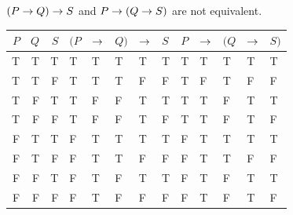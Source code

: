 \begin{small}
\begin{earg}
\noindent\begin{minipage}{0.99\textwidth}
\item $(P \rightarrow Q) \rightarrow S$ and $P \rightarrow (Q \rightarrow S)$ are not equivalent.
\begin{flushleft}
\begin{tabular}{d d d | f e e e h | f e e e e}
$P$ & $Q$ & $S$ & $(P$ & $\rightarrow$ & $Q)$ & $\rightarrow$ & $S$ & $P$ & $\rightarrow$ & $(Q$ & $\rightarrow$ & $S)$\\
\hline
T & T & T &      T & T & T &   T & T &      T & T &   T & T & T\Tstrut\\
T & T & F &      T & T & T &   F & F &      T & F &   T & F & F\\
T & F & T &      T & F & F &   T & T &      T & T &   F & T & T\\
T & F & F &      T & F & F &   T & F &      T & T &   F & T & F\\\hline
F & T & T &      F & T & T &   T & T &      F & T &   T & T & T\Tstrut\\
F & T & F &      F & T & T &   F & F &      F & T &   T & F & F\\
F & F & T &      F & T & F &   T & T &      F & T &   F & T & T\\
F & F & F &      F & T & F &   F & F &      F & T &   F & T & F 
\end{tabular}
\end{flushleft}
\end{minipage}
\medskip

\end{earg}
\end{small}
